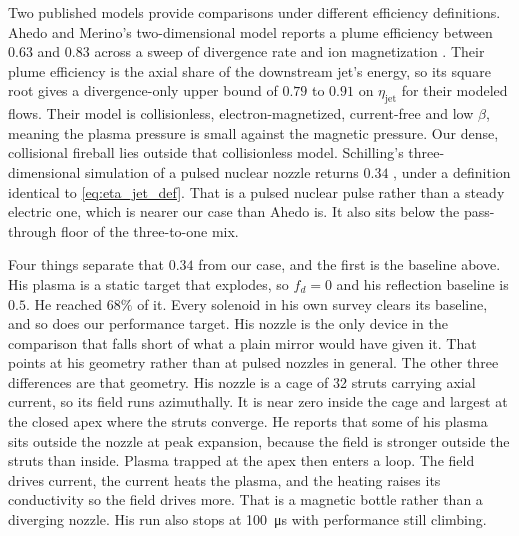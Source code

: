 \documentclass{article}
\begin{document}
Two published models provide comparisons under different efficiency definitions. Ahedo and Merino's two-dimensional model reports a plume efficiency between $0.63$ and $0.83$ across a sweep of divergence rate and ion magnetization \cite{ahedo2010magnetic}. Their plume efficiency is the axial share of the downstream jet's energy, so its square root gives a divergence-only upper bound of $0.79$ to $0.91$ on $\eta_{\mathrm{jet}}$ for their modeled flows. Their model is collisionless, electron-magnetized, current-free and low $\beta$, meaning the plasma pressure is small against the magnetic pressure. Our dense, collisional fireball lies outside that collisionless model. Schilling's three-dimensional simulation of a pulsed nuclear nozzle returns $0.34$ \cite{schilling2022nozzle}, under a definition identical to \autoref{eq:eta_jet_def}. That is a pulsed nuclear pulse rather than a steady electric one, which is nearer our case than Ahedo is. It also sits below the pass-through floor of the three-to-one mix.

Four things separate that $0.34$ from our case, and the first is the baseline above. His plasma is a static target that explodes, so $f_d = 0$ and his reflection baseline is $0.5$. He reached $68\%$ of it. Every solenoid in his own survey clears its baseline, and so does our performance target. His nozzle is the only device in the comparison that falls short of what a plain mirror would have given it. That points at his geometry rather than at pulsed nozzles in general. The other three differences are that geometry. His nozzle is a cage of 32 struts carrying axial current, so its field runs azimuthally. It is near zero inside the cage and largest at the closed apex where the struts converge. He reports that some of his plasma sits outside the nozzle at peak expansion, because the field is stronger outside the struts than inside. Plasma trapped at the apex then enters a loop. The field drives current, the current heats the plasma, and the heating raises its conductivity so the field drives more. That is a magnetic bottle rather than a diverging nozzle. His run also stops at \SI{100}{\micro\second} with performance still climbing.
\end{document}
